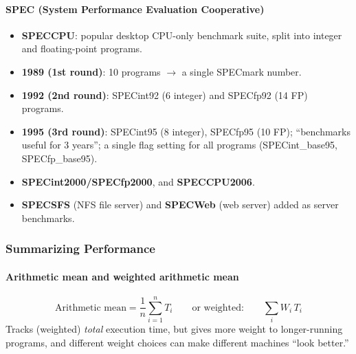 \paragraph{SPEC (System Performance Evaluation Cooperative)}
\begin{itemize}
  \item \textbf{SPECCPU}: popular desktop CPU-only benchmark suite, split
  into integer and floating-point programs.
  \item \textbf{1989 (1st round)}: 10 programs $\to$ a single SPECmark number.
  \item \textbf{1992 (2nd round)}: SPECint92 (6 integer) and SPECfp92 (14
  FP) programs.
  \item \textbf{1995 (3rd round)}: SPECint95 (8 integer), SPECfp95 (10 FP);
  ``benchmarks useful for 3 years''; a single flag setting for all programs
  (SPECint\_base95, SPECfp\_base95).
  \item \textbf{SPECint2000/SPECfp2000}, and \textbf{SPECCPU2006}.
  \item \textbf{SPECSFS} (NFS file server) and \textbf{SPECWeb} (web
  server) added as server benchmarks.
\end{itemize}

\subsubsection{Summarizing Performance}
\label{sec:summarizing}

\paragraph{Arithmetic mean and weighted arithmetic mean}
\[
  \text{Arithmetic mean} = \frac{1}{n}\sum_{i=1}^n T_i \qquad\text{or
  weighted:}\qquad \sum_i W_i \, T_i
\]
Tracks (weighted) \emph{total} execution time, but gives more weight to
longer-running programs, and different weight choices can make different
machines ``look better.''

